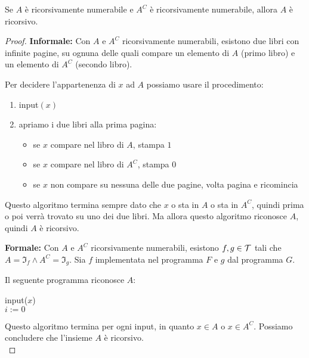 \begin{theor}
	Se $A$ è ricorsivamente numerabile e $A^C$ è ricorsivamente numerabile, allora $A$ è ricorsivo.
\end{theor}
\begin{proof}
	\textbf{Informale:} Con $A$ e $A^C$ ricorsivamente numerabili, esistono due libri con infinite pagine, su ognuna delle quali compare un elemento di $A$ (primo libro) e un elemento di $A^C$ (secondo libro).

	Per decidere l'appartenenza di $x$ ad $A$ possiamo usare il procedimento:
	\begin{enumerate}
		\item input$(x)$
        
		\item apriamo i due libri alla prima pagina:
		\begin{itemize}
			\item se $x$ compare nel libro di $A$, stampa $1$
		
        	\item se $x$ compare nel libro di $A^C$, stampa $0$
		
        	\item se $x$ non compare su nessuna delle due pagine, volta pagina e ricomincia
		\end{itemize}
	\end{enumerate}

	Questo algoritmo termina sempre dato che $x$ o sta in $A$ o sta in $A^C$, quindi prima o poi verrà trovato su uno dei due libri. Ma allora questo algoritmo riconosce $A$, quindi $A$ è ricorsivo.

	\textbf{Formale:} Con $A$ e $A^C$ ricorsivamente numerabili, esistono $f,g \in \mathcal{T}$ tali che $A = \Im_f \wedge A^C = \Im_g$. Sia $f$ implementata nel programma $F$ e $g$ dal programma $G$. 
    
    Il seguente programma riconosce $A$:
	\begin{center}
		\begin{minipage}{.5\textwidth}
			\begin{tcolorbox}[
				colback=white,
				sharp corners,
				boxrule=.3mm,
				left=20pt,
				top=0pt,
				bottom=0pt,
				colbacktitle=white,
				coltitle=black
				]
				\begin{algorithm}[H]
					input($x$) \\
					$i:=0$ \\
				\end{algorithm}
			\end{tcolorbox}
		\end{minipage}
	\end{center}

	Questo algoritmo termina per ogni input, in quanto $x \in A$ o $x \in A^C$. Possiamo concludere che l'insieme $A$ è ricorsivo. \\
\end{proof}

